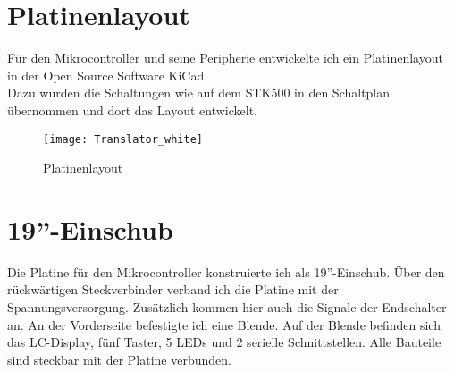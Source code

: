 \section{Platinenlayout}
Für den Mikrocontroller und seine Peripherie entwickelte ich ein Platinenlayout in der Open Source Software KiCad. \\ 
Dazu wurden die Schaltungen wie auf dem STK500 in den Schaltplan übernommen und dort das Layout entwickelt. 
\begin{figure}[htb]
\centering
\texttt{[image: Translator\_white]}
\caption{Platinenlayout}
\label{fig:Platine}
\end{figure}
\section{19''-Einschub}
Die Platine für den Mikrocontroller konstruierte ich als 19''-Einschub. Über den rückwärtigen Steckverbinder verband ich die Platine mit der Spannungsversorgung. Zusätzlich kommen hier auch die Signale der Endschalter an.
An der Vorderseite befestigte ich eine Blende. Auf der Blende befinden sich das LC-Display, fünf Taster, 5 LEDs und 2 serielle Schnittstellen. Alle Bauteile sind steckbar mit der Platine verbunden. 


